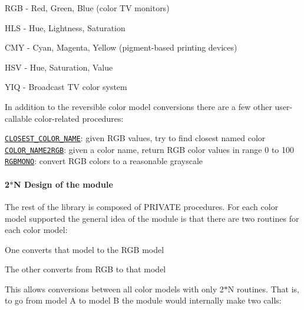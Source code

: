 \begin{DoxyDescription}
\begin{DoxyItemize}
\item R\+GB -\/ Red, Green, Blue (color TV monitors) 
\item H\+LS -\/ Hue, Lightness, Saturation 
\item C\+MY -\/ Cyan, Magenta, Yellow (pigment-\/based printing devices) 
\item H\+SV -\/ Hue, Saturation, Value 
\item Y\+IQ -\/ Broadcast TV color system 
\end{DoxyItemize}



In addition to the reversible color model conversions there are a few other user-\/callable color-\/related procedures\+: 




\begin{DoxyPre}\end{DoxyPre}



\begin{DoxyPre}    \href{closest_color_name.3m_color.html}{\tt CLOSEST\_COLOR\_NAME}:  given RGB values, try to find closest named color
    \href{color_name2rgb.3m_color.html}{\tt COLOR\_NAME2RGB}:  given a color name, return RGB color values in range 0 to 100
    \href{rgbmono.3m_color.html}{\tt RGBMONO}:  convert RGB colors to a reasonable grayscale
 \end{DoxyPre}


\paragraph*{2$\ast$N Design of the module}





The rest of the library is composed of P\+R\+I\+V\+A\+TE procedures. For each color model supported the general idea of the module is that there are two routines for each color model\+: 




\begin{DoxyItemize}
\item One converts that model to the R\+GB model  
\item The other converts from R\+GB to that model  
\end{DoxyItemize}



This allows conversions between all color models with only 2$\ast$N routines. That is, to go from model A to model B the module would internally make two calls\+: 





\end{DoxyDescription}
